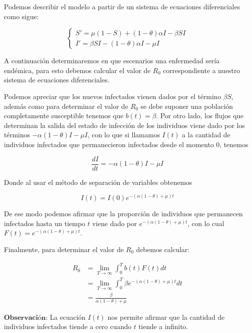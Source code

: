 Podemos describir el modelo a partir de un sistema de ecuaciones diferenciales como sigue:

\begin{equation}
\left\{
\begin{array}{l}
S' = \mu(1 - S) + (1 - \theta)\alpha I - \beta S I \\
I' = \beta S I - (1 - \theta)\alpha I - \mu I
\end{array}
\right.
\end{equation}

A continuación determinaremos en que escenarios una enfermedad sería endémica, para esto debemos calcular el valor de $R_0$ correspondiente a nuestro sistema de ecuaciones diferenciales.

Podemos apreciar que los nuevos infectados vienen dados por el término $\beta S$, además como para determinar el valor de $R_0$ se debe suponer una población completamente susceptible tenemos que $b(t) = \beta$. Por otro lado, los flujos que determinan la salida del estado de infección de los individuos viene dado por los términos $-\alpha(1-\theta)I-\mu I$, con lo que si llamamos $I(t)$ a la cantidad de individuos infectados que permanecieron infectados desde el momento 0, tenemos

\begin{equation}
\frac{dI}{dt} = -\alpha(1-\theta)I-\mu I
\end{equation}

Donde al usar el método de separación de variables obtenemos

\begin{equation}
I(t) = I(0)e^{-(\alpha(1-\theta)+\mu)t}
\end{equation}

De ese modo podemos afirmar que la proporción de individuos que permanecen infectados hasta un tiempo $t$ viene dado por $e^{-(\alpha(1-\theta)+\mu)t}$, con lo cual $F(t)=e^{-(\alpha(1-\theta)+\mu)t}$.

Finalmente, para determinar el valor de $R_0$ debemos calcular:

\begin{align}
R_0 &= \lim_{T\to\infty}\int_0^T b(t)F(t) dt \\
&= \lim_{T\to\infty}\int_0^T \beta e^{-(\alpha(1-\theta)+\mu)t} dt\\
&= \frac{\beta}{\alpha(1-\theta)+\mu}
\end{align}

$\textbf{Observación:}$ La ecuación $I(t)$ nos permite afirmar que la cantidad de individuos infectados tiende a cero cuando $t$ tiende a infinito.


